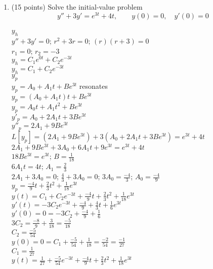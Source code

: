 \documentclass{article}
\begin{document}
\begin{enumerate}

\item (15 points)  Solve the initial-value problem
\[
y''+3y' = e^{3t} + 4t, \qquad y(0)=0, \quad y'(0)=0
\]
\\$y_h$
\\$y''+3y'=0$; $r^2+3r=0$; $(r)(r+3)=0$
\\$r_1=0$; $r_2=-3$
\\$y_h=C_1e^{0t}+C_2e^{-3t}$
\\$y_h=C_1+C_2e^{-3t}$
\\$y_p$
\\$y_p=A_0+A_1t+Be^{3t}$ resonates
\\$y_p=(A_0+A_1t)t+Be^{3t}$
\\$y_p=A_0t+A_1t^2+Be^{3t}$
\\$y'_p=A_0+2A_1t+3Be^{3t}$
\\$y''_p=2A_1+9Be^{3t}$
\\$L[y_p]=(2A_1+9Be^{3t})+3(A_0+2A_1t+3Be^{3t})=e^{3t}+4t$
\\$2A_1+9Be^{3t}+3A_0+6A_1t+9e^{3t}=e^{3t}+4t$
\\$18Be^{3t}=e^{3t}$; $B=\frac{1}{18}$
\\$6A_1t=4t$; $A_1=\frac{2}{3}$
\\$2A_1+3A_0=0$; $\frac{4}{3}+3A_0=0$; $3A_0=\frac{-4}{3}$; $A_0=\frac{-4}{9}$
\\$y_p=\frac{-4}{9}t+\frac{2}{3}t^2+\frac{1}{18}e^{3t}$
\\$y(t)=C_1+C_2e^{-3t}+\frac{-4}{9}t+\frac{2}{3}t^2+\frac{1}{18}e^{3t}$
\\$y'(t)=-3C_2e^{-3t}+\frac{-4}{9}+\frac{4}{3}t+\frac{1}{6}e^{3t}$
\\$y'(0)=0=-3C_2+\frac{-4}{9}+\frac{1}{6}$
\\$3C_2=\frac{-8}{9}+\frac{3}{18}=\frac{-5}{18}$
\\$C_2=\frac{-5}{54}$
\\$y(0)=0=C_1+\frac{-5}{54}+\frac{1}{18}=\frac{-2}{54}=\frac{-1}{27}$
\\$C_1=\frac{1}{27}$
\\$y(t)=\frac{1}{27}+\frac{-5}{54}e^{-3t}+\frac{-4}{9}t+\frac{2}{3}t^2+\frac{1}{18}e^{3t}$



\end{enumerate}
\end{document}

